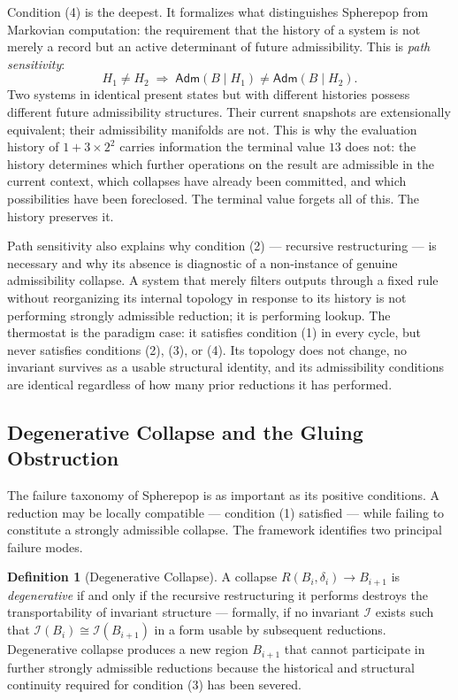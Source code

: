 \documentclass[12pt,openany]{book}
\theoremstyle{plain}
\theoremstyle{definition}
\newtheorem{definition}[theorem]{Definition}
\theoremstyle{remark}
\begin{document}
Condition (4) is the deepest. It formalizes what distinguishes Spherepop from Markovian computation: the requirement that the history of a system is not merely a record but an active determinant of future admissibility. This is \emph{path sensitivity}:
\[
  H_1 \neq H_2 \;\Rightarrow\; \mathsf{Adm}(B \mid H_1) \neq \mathsf{Adm}(B \mid H_2).
\]
Two systems in identical present states but with different histories possess different future admissibility structures. Their current snapshots are extensionally equivalent; their admissibility manifolds are not. This is why the evaluation history of $1 + 3 \times 2^2$ carries information the terminal value $13$ does not: the history determines which further operations on the result are admissible in the current context, which collapses have already been committed, and which possibilities have been foreclosed. The terminal value forgets all of this. The history preserves it.

Path sensitivity also explains why condition (2) — recursive restructuring — is necessary and why its absence is diagnostic of a non-instance of genuine admissibility collapse. A system that merely filters outputs through a fixed rule without reorganizing its internal topology in response to its history is not performing strongly admissible reduction; it is performing lookup. The thermostat is the paradigm case: it satisfies condition (1) in every cycle, but never satisfies conditions (2), (3), or (4). Its topology does not change, no invariant survives as a usable structural identity, and its admissibility conditions are identical regardless of how many prior reductions it has performed.

\subsection*{Degenerative Collapse and the Gluing Obstruction}

The failure taxonomy of Spherepop is as important as its positive conditions. A reduction may be locally compatible — condition (1) satisfied — while failing to constitute a strongly admissible collapse. The framework identifies two principal failure modes.

\begin{definition}[Degenerative Collapse]
A collapse $R(B_i, \delta_i) \to B_{i+1}$ is \emph{degenerative} if and only if the recursive restructuring it performs destroys the transportability of invariant structure — formally, if no invariant $\mathcal{I}$ exists such that $\mathcal{I}(B_i) \cong \mathcal{I}(B_{i+1})$ in a form usable by subsequent reductions. Degenerative collapse produces a new region $B_{i+1}$ that cannot participate in further strongly admissible reductions because the historical and structural continuity required for condition (3) has been severed.
\end{definition}
\end{document}
